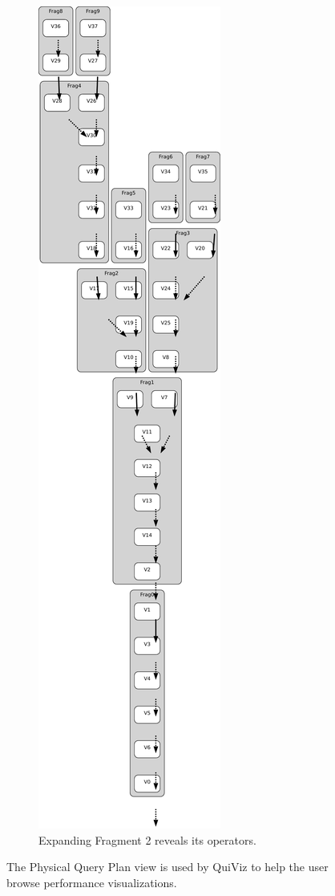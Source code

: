 \documentclass{chi2009}
\newcommand*{\system}{QuiViz\xspace}
\newcommand*{\graph}{Physical Query Plan\xspace}
\begin{document}
\begin{figure}[ht]
\begin{subfigure}[b]{0.49\columnwidth}
    \includegraphics[width=0.8\columnwidth]{images/graph_expanded}
    \caption{Expanding Fragment 2 reveals its operators.}
    \label{fig:graph_expanded}
  \end{subfigure}
  \caption{The \graph view is used by \system to help the user browse performance visualizations.}
  \label{fig:graph}
\end{figure}
\end{document}
